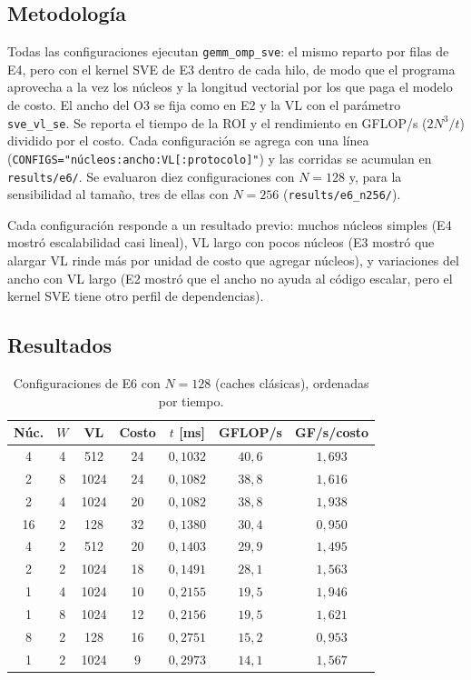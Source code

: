 \documentclass[journal]{IEEEtran}
\begin{document}
\subsection{Metodología}

Todas las configuraciones ejecutan \texttt{gemm\_omp\_sve}: el mismo
reparto por filas de E4, pero con el kernel SVE de E3 dentro de cada
hilo, de modo que el programa aprovecha a la vez los núcleos y la
longitud vectorial por los que paga el modelo de costo. El ancho del O3
se fija como en E2 y la VL con el parámetro \texttt{sve\_vl\_se}. Se
reporta el tiempo de la ROI y el rendimiento en GFLOP/s ($2N^3/t$)
dividido por el costo. Cada configuración se agrega con una línea
(\texttt{CONFIGS="núcleos:ancho:VL[:protocolo]"}) y las corridas se
acumulan en \texttt{results/e6/}. Se evaluaron diez configuraciones con
$N=128$ y, para la sensibilidad al tamaño, tres de ellas con $N=256$
(\texttt{results/e6\_n256/}).

Cada configuración responde a un resultado previo: muchos núcleos
simples (E4 mostró escalabilidad casi lineal), VL largo con pocos
núcleos (E3 mostró que alargar VL rinde más por unidad de costo que
agregar núcleos), y variaciones del ancho con VL largo (E2 mostró que
el ancho no ayuda al código escalar, pero el kernel SVE tiene otro
perfil de dependencias).

\subsection{Resultados}

\begin{table}[!t]
\centering
\caption{Configuraciones de E6 con $N = 128$ (caches clásicas),
ordenadas por tiempo.}
\label{tab:e6}
\footnotesize
\setlength{\tabcolsep}{2pt}
\begin{tabular}{|c|c|c|c|c|c|c|}
\hline
\textbf{Núc.} & $W$ & \textbf{VL} & \textbf{Costo} &
\textbf{$t$ [ms]} & \textbf{GFLOP/s} & \textbf{GF/s/costo} \\ \hline
4  & 4 & 512  & 24 & $0{,}1032$ & $40{,}6$ & $1{,}693$ \\ \hline
2  & 8 & 1024 & 24 & $0{,}1082$ & $38{,}8$ & $1{,}616$ \\ \hline
2  & 4 & 1024 & 20 & $0{,}1082$ & $38{,}8$ & $1{,}938$ \\ \hline
16 & 2 & 128  & 32 & $0{,}1380$ & $30{,}4$ & $0{,}950$ \\ \hline
4  & 2 & 512  & 20 & $0{,}1403$ & $29{,}9$ & $1{,}495$ \\ \hline
2  & 2 & 1024 & 18 & $0{,}1491$ & $28{,}1$ & $1{,}563$ \\ \hline
1  & 4 & 1024 & 10 & $0{,}2155$ & $19{,}5$ & $1{,}946$ \\ \hline
1  & 8 & 1024 & 12 & $0{,}2156$ & $19{,}5$ & $1{,}621$ \\ \hline
8  & 2 & 128  & 16 & $0{,}2751$ & $15{,}2$ & $0{,}953$ \\ \hline
1  & 2 & 1024 & 9  & $0{,}2973$ & $14{,}1$ & $1{,}567$ \\ \hline
\end{tabular}
\end{table}
\end{document}
